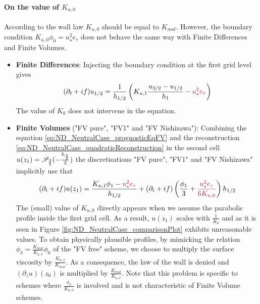 \paragraph{On the value of $K_{u,0}$}
\label{sec:ND_StratifiedCase_viscosity0_FVpure}
According to the wall law $K_{u,0}$ should be equal to $K_{mol}$.
However, the boundary condition $K_{u,0} \phi_0 = u_\star^2 e_\tau$
does not behave the same way with Finite Differences and Finite
Volumes.
\begin{itemize}
	\item \textbf{Finite Differences}:
Injecting the boundary condition at the first grid level gives
		\begin{equation}
			(\partial_t+if) u_{1/2} = \frac{1}{h_{1/2}}
			\left(K_{u,1}\frac{u_{3/2} - u_{1/2}}{h_1}
			 - \emphase{u_\star^2 e_\tau} \right)
		\end{equation}
The value of $K_0$ does not intervene in the equation.
\item \textbf{Finite Volumes} ("FV pure", "FV1" and "FV Nishizawa"):
Combining the equation \eqref{eq:ND_NeutralCase_prognosticEqFV}
and the reconstruction
\eqref{eq:ND_NeutralCase_quadraticReconstruction} in the second cell
$u(z_1) = {\cal S}_{\frac{3}{2}}(-\frac{h_\frac{3}{2}}{2})$
the discretisations "FV pure", "FV1" and "FV Nishizawa"
implicitly use that
\begin{equation}
	(\partial_t+if) u(z_1) =
	\frac{K_{u,1} \phi_1 - \emphase{u_\star^2 e_\tau}}{h_{1/2}}
	+ (\partial_t+if)\left(\frac{\phi_1}{3}
	+ \emphase{\frac{u_\star^2 e_\tau}{6 K_{u,0}}}\right)h_{1/2}
\end{equation}
The (small) value of $K_{u,0}$ directly appears when we assume the
parabolic profile inside the first grid cell.
As a result, $u(z_1)$ scales with $\frac{1}{K_0}$ and
as it is seen in Figure \ref{fig:ND_NeutralCase_comparisonPlot}
exhibits unreasonable values.
To obtain physically plausible profiles,
by mimicking the relation
$\phi_{\delta} = \frac{K_{mol}}{K_{u,\delta}}\phi_0$ of the
"FV free" scheme, we choose to multiply the surface
viscosity by $\frac{K_{u,\delta}}{K_{mol}}$.
As a consequence, the law of the wall is denied and
$(\partial_z u)(z_0)$ is multiplied
by $\frac{K_{mol}}{K_{u,\delta}}$.
Note that this problem is specific to schemes where
$\frac{\phi_0}{K_{u,0}}$ is involved and
is not characteristic of Finite Volume schemes.
\end{itemize}

